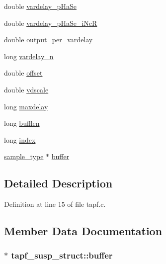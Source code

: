 \begin{DoxyCompactItemize}
\item 
double \hyperlink{structtapf__susp__struct_a3af8412cc866f36cd13a276e69bb1ce7}{vardelay\+\_\+p\+Ha\+Se}
\item 
double \hyperlink{structtapf__susp__struct_a674adc2fae676ce338e7df03e834d3cb}{vardelay\+\_\+p\+Ha\+Se\+\_\+i\+NcR}
\item 
double \hyperlink{structtapf__susp__struct_a9e355bfb525fc4c088cf6fe555610d1b}{output\+\_\+per\+\_\+vardelay}
\item 
long \hyperlink{structtapf__susp__struct_a4b42c19983958fe91caf8248f0468a19}{vardelay\+\_\+n}
\item 
double \hyperlink{structtapf__susp__struct_a7e427a402a456d98ff88e23c0d123d13}{offset}
\item 
double \hyperlink{structtapf__susp__struct_aafb43668af19062c086eb9649bc1e0b9}{vdscale}
\item 
long \hyperlink{structtapf__susp__struct_a06d35bd70e11ce820c07c313dece4c37}{maxdelay}
\item 
long \hyperlink{structtapf__susp__struct_ac3f42160020de0ba7d95c65bb6435dd7}{bufflen}
\item 
long \hyperlink{structtapf__susp__struct_aabaee1fe947b620822d6dce4282d20d1}{index}
\item 
\hyperlink{sound_8h_a3a9d1d4a1c153390d2401a6e9f71b32c}{sample\+\_\+type} $\ast$ \hyperlink{structtapf__susp__struct_acc889e704342ef9bc098dfefe6ed2ddf}{buffer}
\end{DoxyCompactItemize}


\subsection{Detailed Description}


Definition at line 15 of file tapf.\+c.



\subsection{Member Data Documentation}
\subsubsection[{\texorpdfstring{buffer}{buffer}}]{$\ast$ tapf\+\_\+susp\+\_\+struct\+::buffer}\hypertarget{structtapf__susp__struct_acc889e704342ef9bc098dfefe6ed2ddf}{}\label{structtapf__susp__struct_acc889e704342ef9bc098dfefe6ed2ddf}


